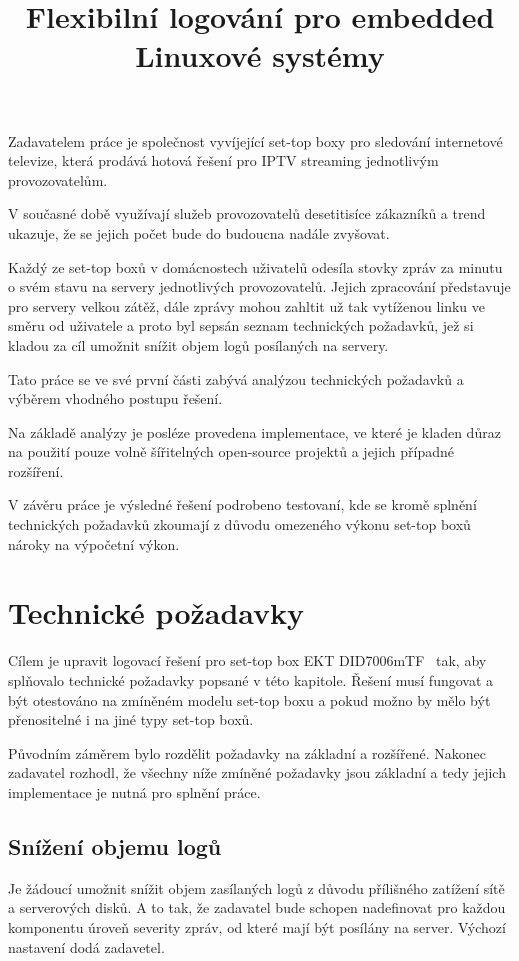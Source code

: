 \documentclass[thesis=B,czech]{FITthesis}[2012/06/26]
\title{Flexibilní logování pro embedded Linuxové systémy}
\begin{document}
\begin{introduction}
Zadavatelem práce je společnost vyvíjející set-top boxy pro sledování internetové televize, která prodává hotová řešení pro IPTV streaming jednotlivým provozovatelům.

V současné době využívají služeb provozovatelů desetitisíce zákazníků a trend ukazuje, že se jejich počet bude do budoucna nadále zvyšovat.

Každý ze set-top boxů v domácnostech uživatelů odesíla stovky zpráv za minutu o svém stavu na servery jednotlivých provozovatelů. Jejich zpracování představuje pro servery velkou zátěž, dále zprávy mohou zahltit už tak vytíženou linku ve směru od uživatele a proto byl sepsán seznam technických požadavků, jež si kladou za cíl umožnit snížit objem logů posílaných na servery.

Tato práce se ve své první části zabývá analýzou technických požadavků a výběrem vhodného postupu řešení.
 
Na základě analýzy je posléze provedena implementace, ve které je kladen důraz na použití pouze volně šířitelných open-source projektů a jejich případné rozšíření.
 
V závěru práce je výsledné řešení podrobeno testovaní, kde se kromě splnění technických požadavků zkoumají z důvodu omezeného výkonu set-top boxů nároky na výpočetní výkon.
\end{introduction}

\chapter{Technické požadavky}
Cílem je upravit logovací řešení pro set-top box EKT DID7006mTF~\cite{ekt7006} tak, aby splňovalo technické požadavky popsané v této kapitole. Řešení musí fungovat a být otestováno na zmíněném modelu set-top boxu a pokud možno by mělo být přenositelné i na jiné typy set-top boxů.

Původním záměrem bylo rozdělit požadavky na základní a rozšířené. Nakonec zadavatel rozhodl, že všechny níže zmíněné požadavky jsou základní a tedy jejich implementace je nutná pro splnění práce.

\section*{Snížení objemu logů}
Je žádoucí umožnit snížit objem zasílaných logů z důvodu přílišného zatížení sítě a serverových disků. A to tak, že zadavatel bude schopen nadefinovat pro každou komponentu úroveň severity zpráv, od které mají být posílány na server. Výchozí nastavení dodá zadavetel.
\end{document}

